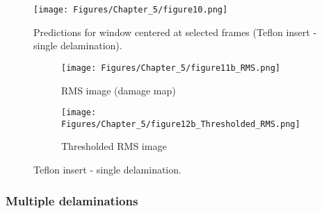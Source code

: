 \begin{figure}[!h]
	\centering
	\texttt{[image: Figures/Chapter\_5/figure10.png]}
	\caption{Predictions for window centered at selected frames (Teflon insert - single delamination).}
	\label{fig:CFRP_Teflon_3o_predictions}
\end{figure}
\begin{figure} [!h]
	\begin{subfigure}[b]{.5\textwidth}
		\centering
		\texttt{[image: Figures/Chapter\_5/figure11b\_RMS.png]}
		\caption{RMS image (damage map)}
		\label{fig:RMS_CFRP_Teflon_3o_saeed}
	\end{subfigure}
	\hfill
	\begin{subfigure}[b]{.42\textwidth}
		\centering
		\texttt{[image: Figures/Chapter\_5/figure12b\_Thresholded\_RMS.png]}
		\caption{Thresholded RMS image} 
		\label{fig:RMS_CFRP_Teflon_3o_ijjeh}
	\end{subfigure}
	\caption{Teflon insert - single delamination.}
	\label{fig:RMS_CFRP_Teflon_3o_images}
\end{figure} 
\clearpage
\subsubsection{Multiple delaminations}
\label{sec5322}

